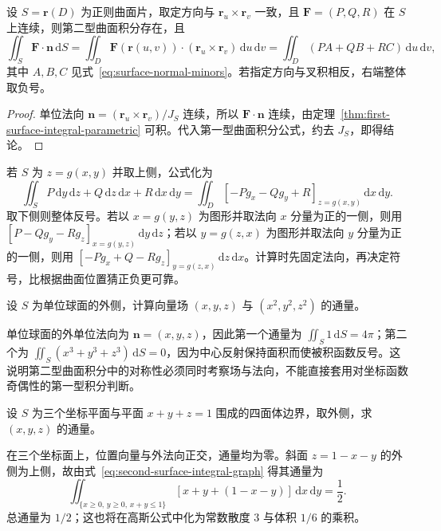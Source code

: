 \begin{theorem}
\label{thm:second-surface-integral-parametric}
设 $S=\boldsymbol r(D)$ 为正则曲面片，取定方向与 $\boldsymbol r_u\times\boldsymbol r_v$ 一致，且 $\boldsymbol F=(P,Q,R)$ 在 $S$ 上连续，则第二型曲面积分存在，且
\begin{equation}
\label{eq:second-surface-integral-parametric}
    \iint_S\boldsymbol F\cdot\boldsymbol n\,\mathrm dS
    =\iint_D\boldsymbol F(\boldsymbol r(u,v))\cdot
      (\boldsymbol r_u\times\boldsymbol r_v)\,\mathrm du\,\mathrm dv
    =\iint_D(PA+QB+RC)\,\mathrm du\,\mathrm dv,
\end{equation}
其中 $A,B,C$ 见式~\eqref{eq:surface-normal-minors}。若指定方向与叉积相反，右端整体取负号。
\end{theorem}
\begin{proof}
单位法向 $\boldsymbol n=(\boldsymbol r_u\times\boldsymbol r_v)/J_S$ 连续，所以 $\boldsymbol F\cdot\boldsymbol n$ 连续，由定理~\ref{thm:first-surface-integral-parametric} 可积。代入第一型曲面积分公式，约去 $J_S$，即得结论。
\end{proof}

若 $S$ 为 $z=g(x,y)$ 并取上侧，公式化为
\begin{equation}
\label{eq:second-surface-integral-graph}
    \iint_S P\,\mathrm dy\,\mathrm dz+Q\,\mathrm dz\,\mathrm dx+R\,\mathrm dx\,\mathrm dy
    =\iint_D[-Pg_x-Qg_y+R]_{z=g(x,y)}\,\mathrm dx\,\mathrm dy.
\end{equation}
取下侧则整体反号。若以 $x=g(y,z)$ 为图形并取法向 $x$ 分量为正的一侧，则用 $[P-Qg_y-Rg_z]_{x=g(y,z)}\,\mathrm dy\,\mathrm dz$；若以 $y=g(z,x)$ 为图形并取法向 $y$ 分量为正的一侧，则用 $[-Pg_x+Q-Rg_z]_{y=g(z,x)}\,\mathrm dz\,\mathrm dx$。计算时先固定法向，再决定符号，比根据曲面位置猜正负更可靠。

\begin{example}
\label{ex:second-surface-integral-unit-sphere}
设 $S$ 为单位球面的外侧，计算向量场 $(x,y,z)$ 与 $(x^2,y^2,z^2)$ 的通量。
\end{example}
\begin{solve}
单位球面的外单位法向为 $\boldsymbol n=(x,y,z)$，因此第一个通量为 $\iint_S1\,\mathrm dS=4\pi$；第二个为 $\iint_S(x^3+y^3+z^3)\,\mathrm dS=0$，因为中心反射保持面积而使被积函数反号。这说明第二型曲面积分中的对称性必须同时考察场与法向，不能直接套用对坐标函数奇偶性的第一型积分判断。
\end{solve}

\begin{example}
\label{ex:second-surface-integral-tetrahedron}
设 $S$ 为三个坐标平面与平面 $x+y+z=1$ 围成的四面体边界，取外侧，求 $(x,y,z)$ 的通量。
\end{example}
\begin{solve}
在三个坐标面上，位置向量与外法向正交，通量均为零。斜面 $z=1-x-y$ 的外侧为上侧，故由式~\eqref{eq:second-surface-integral-graph} 得其通量为
\[
    \iint_{\{x\geq0,\,y\geq0,\,x+y\leq1\}}
    [x+y+(1-x-y)]\,\mathrm dx\,\mathrm dy=\frac12.
\]
总通量为 $1/2$；这也将在高斯公式中化为常数散度 $3$ 与体积 $1/6$ 的乘积。
\end{solve}

